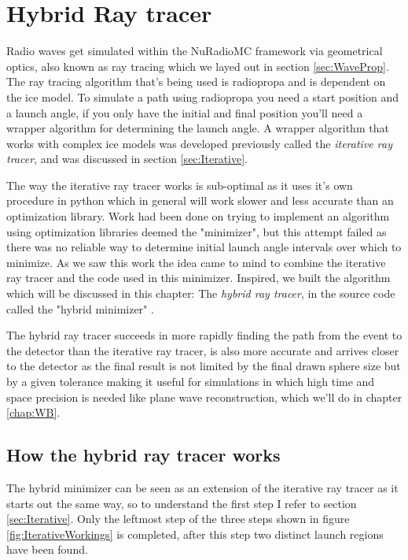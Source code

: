 \chapter{Hybrid Ray tracer}
\label{chapter:hybrid}
Radio waves get simulated within the NuRadioMC framework via geometrical
optics, also known as ray tracing which we layed out in section \ref{sec:WaveProp}.
The ray tracing algorithm that's being used is radiopropa and is dependent on
the ice model. To simulate a path using radiopropa you need a start position 
and a launch angle, if you only have the initial and final position you'll need
a wrapper algorithm for determining the launch angle.  
A wrapper algorithm that works with complex ice models was developed previously
called the \textit{iterative ray tracer}\cite{2022icrc.confE1027O}, and was
discussed in section \ref{sec:Iterative}.

The way the iterative ray tracer works is sub-optimal as it uses it's own
procedure in python which in general will work slower and less accurate than an
optimization library. Work had been done on trying to implement an algorithm
using optimization libraries deemed the "minimizer", but this attempt failed as
there was no reliable way to determine initial launch angle intervals over
which to minimize.  As we saw this work the idea came to mind to combine the
iterative ray tracer and the code used in this minimizer. Inspired, we
built the algorithm which will be discussed in this chapter: The \textit{hybrid ray
tracer}, in the source code called the "hybrid minimizer" \cite{hybrid}. 

The hybrid ray tracer succeeds in more rapidly finding the path from the event
to the detector than the iterative ray tracer, is also more accurate and
arrives closer to the detector as the final result is not limited by the final
drawn sphere size but by a given tolerance making it useful for simulations in
which high time and space precision is needed like plane wave reconstruction,
which we'll do in chapter \ref{chap:WB}.

\section{How the hybrid ray tracer works}
The hybrid minimizer can be seen as an extension of the iterative ray tracer as
it starts out the same way, so to understand the first step I refer to section 
\ref{sec:Iterative}. Only the leftmost step of the three steps shown in figure
\ref{fig:IterativeWorkings} is completed, after this step two distinct launch regions
have been found.

